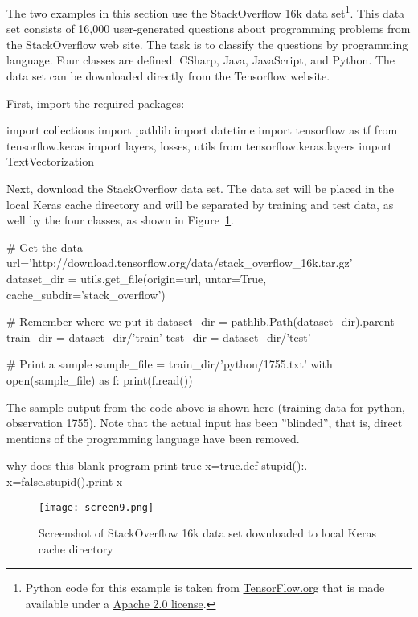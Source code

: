 The two examples in this section use the StackOverflow 16k data set\footnote{Python code for this example is taken from \href{https://www.tensorflow.org/tutorials/load_data/text}{TensorFlow.org} that is made available under a \href{https://www.apache.org/licenses/LICENSE-2.0}{Apache 2.0 license}.}. This data set consists of 16,000 user-generated questions about programming problems from the StackOverflow web site. The task is to classify the questions by programming language. Four classes are defined: CSharp, Java, JavaScript, and Python. The data set can be downloaded directly from the Tensorflow website.

First, import the required packages:

\begin{pythoncode}
import collections
import pathlib
import datetime
import tensorflow as tf
from tensorflow.keras import layers, losses, utils
from tensorflow.keras.layers import TextVectorization
\end{pythoncode}

Next, download the StackOverflow data set. The data set will be placed in the local Keras cache directory and will be separated by training and test data, as well by the four classes, as shown in Figure~\ref{fig:screen9_chap16}.

\begin{pythoncode}
# Get the data
url='http://download.tensorflow.org/data/stack_overflow_16k.tar.gz'
dataset_dir = utils.get_file(origin=url, untar=True,
        cache_subdir='stack_overflow')

# Remember where we put it
dataset_dir = pathlib.Path(dataset_dir).parent
train_dir = dataset_dir/'train'
test_dir = dataset_dir/'test'

# Print a sample
sample_file = train_dir/'python/1755.txt'
with open(sample_file) as f:
  print(f.read())
\end{pythoncode}

The sample output from the code above is shown here (training data for python, observation 1755). Note that the actual input has been ''blinded'', that is, direct mentions of the programming language have been removed.

\begin{textcode}
why does this blank program print true x=true.def stupid():.
x=false.stupid().print x
\end{textcode}

\begin{figure}
\centering

\texttt{[image: screen9.png]}
\caption[StackOverflow dataset in Keras cache directory]{Screenshot of StackOverflow 16k data set downloaded to local Keras cache directory}
\label{fig:screen9_chap16}
\end{figure}

